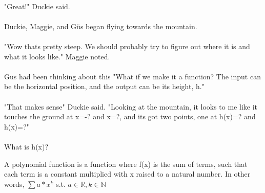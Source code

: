 \paragraph{} "Great!" Duckie said. 
\vfill
\pagebreak
{}
{\paragraph{} Duckie, Maggie, and G{\"u}s began flying towards the mountain. 
\paragraph{} "Wow thats pretty steep. We should probably try to figure out where it is and what it looks like." Maggie noted. 
\paragraph{} Gus had been thinking about this "What if we make it a function? The input can be the horizontal position, and the output can be its height, h."
\paragraph{} "That makes sense" Duckie said. "Looking at the mountain, it looks to me like it touches the ground at x=-? and x=?, and its got two points, one at h(x)=? and h(x)=?" 
\paragraph{} What is h(x)?}
{}
{A polynomial function is a function where f(x) is the sum of terms, such that each term is a constant multiplied with x raised to a natural number. In other words, $\sum a*x^{k}$ s.t. $a \in \mathbb{R}, k \in \mathbb{N}$}
{}

